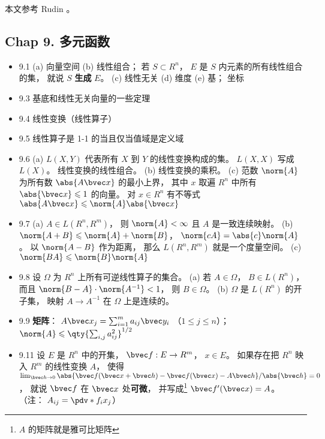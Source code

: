 
本文参考 Rudin \cite{Rudin}。

\subsection{Chap 9. 多元函数}

\begin{itemize}
\item 9.1 (a) 向量空间 (b) 线性组合； 若 $S \subset R^n$， $E$ 是 $S$ 内元素的所有线性组合的集， 就说 $S$ \textbf{生成} $E$。 (c) 线性无关 (d) 维度 (e) 基； 坐标

\item 9.3 基底和线性无关向量的一些定理

\item 9.4 线性变换（线性算子）

\item 9.5 线性算子是 1-1 的当且仅当值域是定义域

\item 9.6 (a) $L(X,Y)$ 代表所有 $X$ 到 $Y$ 的线性变换构成的集。 $L(X,X)$ 写成 $L(X)$。 线性变换的线性组合。 (b) 线性变换的乘积。 (c) 范数 $\norm{A}$ 为所有数 $\abs{A\bvec x}$ 的最小上界， 其中 $x$ 取遍 $R^n$ 中所有 $\abs{\bvec x}\leqslant 1$ 的向量。 对 $x\in R^n$ 有不等式 $\abs{A\bvec x}\leqslant \norm{A}\abs{\bvec x}$

\item 9.7 (a) $A\in L(R^n,R^m)$， 则 $\norm{A}<\infty$ 且 $A$ 是一致连续映射。 (b) $\norm{A+B}\leqslant \norm{A}+\norm{B}$， $\norm{cA} = \abs{c}\norm{A}$。 以 $\norm{A-B}$ 作为距离， 那么 $L(R^n,R^m)$ 就是一个度量空间。 (c) $\norm{BA} \leqslant \norm{B}\norm{A}$

\item 9.8 设 $\Omega$ 为 $R^n$ 上所有可逆线性算子的集合。 (a) 若 $A\in\Omega$， $B\in L(R^n)$， 而且 $\norm{B-A}\cdot\norm{A^{-1}}<1$， 则 $B\in \Omega$。 (b) $\Omega$ 是 $L(R^n)$ 的开子集， 映射 $A\to A^{-1}$ 在 $\Omega$ 上是连续的。

\item 9.9 \textbf{矩阵}： $A\bvec x_j = \sum_{i=1}^m a_{ij}\bvec y_i$ （$1\leqslant j\leqslant n$）； $\norm{A}\leqslant \qty{\sum_{i,j}a_{ij}^2}^{1/2}$

\item 9.11 设 $E$ 是 $R^n$ 中的开集， $\bvec f: E\to R^m$， $x\in E$。 如果存在把 $R^n$ 映入 $R^m$ 的线性变换 $A$， 使得 $\lim_{\bvec h\to 0} \abs{\bvec f(\bvec x+\bvec h) - \bvec f(\bvec x) - A\bvec h}/{\abs{\bvec h}} = 0$， 就说 $\bvec f$ 在 $\bvec x$ 处\textbf{可微}， 并写成\footnote{$A$ 的矩阵就是雅可比矩阵} $\bvec f'(\bvec x) = A$。 （注： $A_{ij} = \pdv*{f_i}{x_j}$）


\end{itemize}
